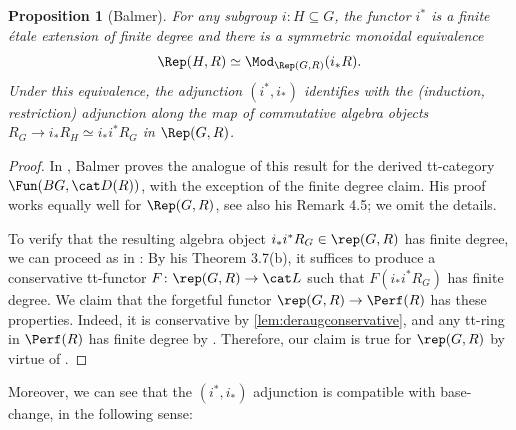 \documentclass{amsart}%
\numberwithin{equation}{section}%
\newtheorem{Prop}[equation]{Proposition}
\theoremstyle{remark}
\begin{document}
\begin{Prop}[Balmer]\label{prop:restrictionetale}
For any subgroup $i\colon H \subseteq G$, the functor $i^*$ is a finite \'etale extension of finite degree and there is a symmetric monoidal equivalence
\[
\Rep(H,R) \simeq \Mod_{\Rep(G,R)}(i_*R).
\]
Under this equivalence, the adjunction $(i^*,i_*)$ identifies with the (induction, restriction) adjunction along the map of commutative algebra objects $R_G \to i_*R_H\simeq i_*i^*R_G$ in $\Rep(G,R)$.
\end{Prop}
\begin{proof}
In \cite[Thm.~4.3]{Balmer15}, Balmer proves the analogue of this result for the derived tt-category $\Fun(BG,\cat D(R))$, with the exception of the finite degree claim. His proof works equally well for $\Rep(G,R)$, see also his Remark 4.5; we omit the details.

To verify that the resulting algebra object $i_*i^*R_G \in \rep(G,R)$ has finite degree, we can proceed as in \cite{Balmer14}: By his Theorem 3.7(b), it suffices to produce a conservative tt-functor $F\colon\rep(G,R) \to \cat L$ such that $F(i_*i^*R_G)$ has finite degree. We claim that the forgetful functor $\rep(G,R) \to \Perf(R)$ has these properties. Indeed, it is conservative by \cref{lem:deraugconservative}, and any tt-ring in $\Perf(R)$ has finite degree by \cite[Cor.~4.3]{Balmer14}. Therefore, our claim is true for $\rep(G,R)$ by virtue of \cite[Thm.~3.7(b)]{Balmer14}.
\end{proof}

Moreover, we can see that the $(i^*,i_*)$ adjunction is compatible with base-change, in the following sense:
\end{document}
